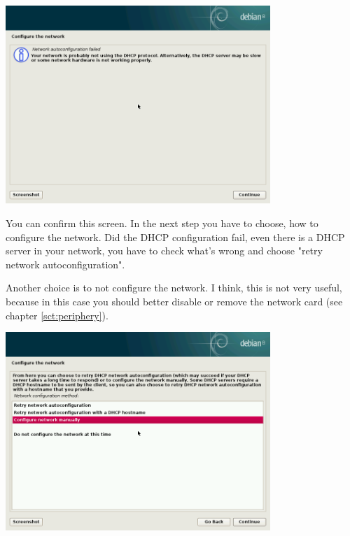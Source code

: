 \documentclass[a4paper,12pt,twoside]{article}
\begin{document}
\bigskip
\begin{minipage}{\linewidth}
    \centering
    \captionsetup{type=figure}
    \includegraphics[width=10cm]{screenshots/message_dhcp_failed.png}
    \label{fig:dhcp_error}
\end{minipage}
\bigskip

You can confirm this screen. In the next step you have to choose, how to
configure the network. Did the DHCP configuration fail, even there is a
DHCP server in your network, you have to check what's
wrong and choose "retry network autoconfiguration".

Another choice is to not configure the network. I think, this is not
very useful, because in this case you should better disable or remove
the network card (see chapter \ref{sct:periphery}).

\bigskip
\begin{minipage}{\linewidth}
    \centering
    \captionsetup{type=figure}
    \includegraphics[width=10cm]{screenshots/select_network_manually.png}
    \label{fig:network_manual}
\end{minipage}
\bigskip
\end{document}

